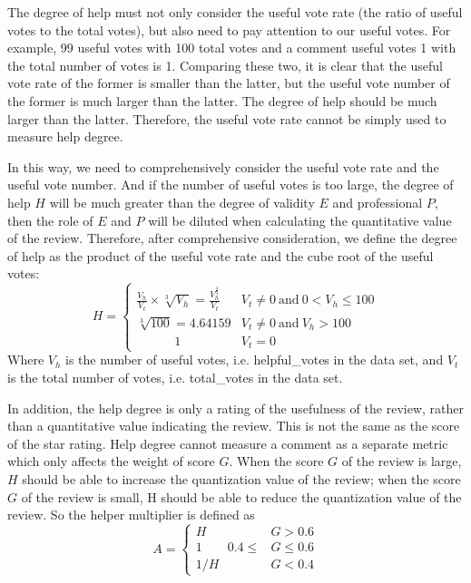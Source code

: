 \documentclass{mcmthesis}
\begin{document}
The degree of help must not only consider the useful vote rate (the ratio of useful votes to the total votes), but also need to pay attention to our useful votes. For example, 99 useful votes with 100 total votes and a comment useful votes 1 with the total number of votes is 1. Comparing these two, it is clear that the useful vote rate of the former is smaller than the latter, but the useful vote number of the former is much larger than the latter. The degree of help should be much larger than the latter. Therefore, the useful vote rate cannot be simply used to measure help degree. 

In this way, we need to comprehensively consider the useful vote rate and the useful vote number. And if the number of useful votes is too large, the degree of help $ H $ will be much greater than the degree of validity $ E $ and professional $ P $, then the role of $ E $ and $ P $ will be diluted when calculating the quantitative value of the review. Therefore, after comprehensive consideration, we define the degree of help as the product of the useful vote rate and the cube root of the useful votes:
\begin{equation}
H=\left\{ \begin{array}{ll} 	\frac{V_h}{V_t}\times \sqrt[3]{V_h}=\frac{V_{h}^{\frac{4}{3}}}{V_t} & V_t\ne 0 \ \text{and} \ 0<V_h\le 100\\ 	\sqrt[3]{100}=4.64159 & V_t\ne 0 \ \text{and} \ V_h>100\\ \qquad\quad 1 & V_t=0 \end{array} \right.
\end{equation}
Where $V_h$ is the number of useful votes, i.e. helpful\_votes in the data set, and $V_t$ is the total number of votes, i.e. total\_votes in the data set.

In addition, the help degree is only a rating of the usefulness of the review, rather than a quantitative value indicating the review. This is not the same as the score of the star rating. Help degree cannot measure a comment as a separate metric which only affects the weight of score $ G $. When the score $ G $ of the review is large, $ H $ should be able to increase the quantization value of the review; when the score $ G $ of the review is small, H should be able to reduce the quantization value of the review. So the helper multiplier is defined as
\begin{equation}
A=\left\{\begin{array}{ll} H & G>0.6 \\ 1 \qquad 0.4\le &G\le0.6 \\ 1/H  & G<0.4\end{array}\right.
\end{equation}
\end{document}
